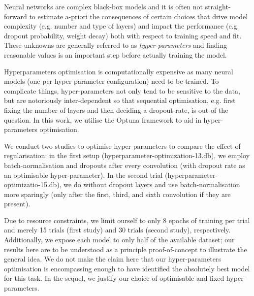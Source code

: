 \documentclass[british,12p]{article}
\begin{document}
    Neural networks are complex black-box models and it is often not straight-forward to estimate a-priori the consequences of certain choices that drive model complexity (e.g. number and type of layers) and impact the performance (e.g. dropout probability, weight decay) both with respect to training speed and fit. These unknowns are generally referred to as \textit{hyper-parameters} and finding reasonable values is an important step before actually training the model.
    
    Hyperparameters optimisation is computationally expensive as many neural models (one per hyper-parameter configuration) need to be trained. To complicate things, hyper-parameters not only tend to be sensitive to the data, but are notoriously inter-dependent so that sequential optimisation, e.g. first fixing the number of layers and then deciding a dropout-rate, is out of the question. In this work, we utilise the Optuna framework to aid in hyper-parameters optimisation. 
    
    We conduct two studies to optimise hyper-parameters to compare the effect of regularisation: in the first setup (hyperparameter-optimization-13.db), we employ batch-normalisation and dropouts after every convolution (with dropout rate as an optimisable hyper-parameter). In the second trial (hyperparameter-optimizatio-15.db), we do without dropout layers and use batch-normalisation more sparingly (only after the first, third, and sixth convolution if they are present).  
    
    Due to resource constraints, we limit ourself to only 8 epochs of training per trial and merely 15 trials (first study) and 30 trials (second study), respectively. Additionally, we expose each model to only half of the available dataset; our results here are to be understood as a principle proof-of-concept to illustrate the general idea. We do not make the claim here that our hyper-parameters optimisation is encompassing enough to have identified the absolutely best model for this task. In the sequel, we justify our choice of optimisable and fixed hyper-parameters.
   
\end{document}
